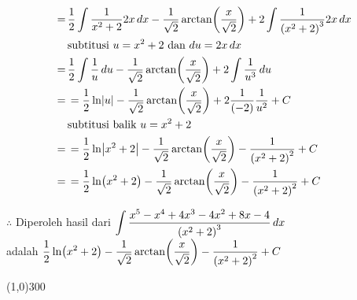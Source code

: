\begin{enumerate}[leftmargin=*, label={\arabic*}.]
\begin{enumerate}[label={\alph*}.]
\begin{align*}
        =\,&\frac{1}{2}\int \frac{1}{x^{2}+2}2x\,dx 
        - \frac{1}{\sqrt{2}}\arctan\brk*{\frac{x}{\sqrt{2}}} 
        + 2\int \frac{1}{\brk*{x^{2}+2}^{3}}2x\,dx\\
        &\text{subtitusi $u=x^{2}+2$ dan $du = 2x\,dx$}\\
        =\,&\frac{1}{2}\int\frac{1}{u}\,du
        -\frac{1}{\sqrt{2}}\arctan\brk*{\frac{x}{\sqrt{2}}} 
        +2\int \frac{1}{u^{3}}\,du\\
        =\,&=\frac{1}{2}\ln\abs{u}-\frac{1}{\sqrt{2}}\arctan\brk*{\frac{x}{\sqrt{2}}} 
        +2\frac{1}{(-2)}\frac{1}{u^{2}}+C\\
        &\text{subtitusi balik $u=x^{2}+2$}\\
        =\,&=\frac{1}{2}\ln\abs*{x^{2}+2}-\frac{1}{\sqrt{2}}\arctan\brk*{\frac{x}{\sqrt{2}}} 
        -\frac{1}{\brk*{x^{2}+2}^{2}}+C\\
        =\,&=\frac{1}{2}\ln\brk*{x^{2}+2}-\frac{1}{\sqrt{2}}\arctan\brk*{\frac{x}{\sqrt{2}}} 
        -\frac{1}{\brk*{x^{2}+2}^{2}}+C
    \end{align*}

    $\therefore$ Diperoleh hasil dari $\ds \int \frac{x^{5}-x^{4}+4x^{3}-4x^{2}+8x-4}{\brk*{x^{2}+2}^{3}}\,dx$\\
    adalah $\ds \frac{1}{2}\ln\brk*{x^{2}+2}-\frac{1}{\sqrt{2}}\arctan\brk*{\frac{x}{\sqrt{2}}} 
    -\frac{1}{\brk*{x^{2}+2}^{2}}+C$

    \end{enumerate}
\end{enumerate}

\begin{center}\line(1,0){300}\end{center}
